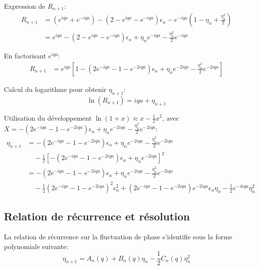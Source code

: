 Expression de $R_{n+1}$:
\begin{align*}
    R_{n+1} &= (e^{iqa} + e^{-iqa}) - (2 - e^{iqa} - e^{-iqa})\epsilon_n - e^{-iqa}\left(1 - \eta_n + \frac{\eta_n^2}{2}\right) \\
    &= e^{iqa} - (2 - e^{iqa} - e^{-iqa})\epsilon_n + \eta_n e^{-iqa} - \frac{\eta_n^2}{2} e^{-iqa}
\end{align*}

En factorisant $e^{iqa}$:
\begin{align*}
    R_{n+1} &= e^{iqa} \left[ 1 - (2e^{-iqa} - 1 - e^{-2iqa})\epsilon_n + \eta_n e^{-2iqa} - \frac{\eta_n^2}{2} e^{-2iqa} \right]
\end{align*}

Calcul du logarithme pour obtenir $\eta_{n+1}$:
\begin{equation*}
    \ln(R_{n+1}) = iqa + \eta_{n+1}
\end{equation*}

Utilisation du développement $\ln(1+x) \approx x - \frac{1}{2}x^2$, avec $X = - (2e^{-iqa} - 1 - e^{-2iqa})\epsilon_n + \eta_n e^{-2iqa} - \frac{\eta_n^2}{2} e^{-2iqa}$:
\begin{align*}
    \eta_{n+1} &= - (2e^{-iqa} - 1 - e^{-2iqa})\epsilon_n + \eta_n e^{-2iqa} - \frac{\eta_n^2}{2} e^{-2iqa} \nonumber \\
    &\quad - \frac{1}{2} {\left[ - (2e^{-iqa} - 1 - e^{-2iqa})\epsilon_n + \eta_n e^{-2iqa} \right]}^2 \\
    &= - (2e^{-iqa} - 1 - e^{-2iqa})\epsilon_n + \eta_n e^{-2iqa} - \frac{\eta_n^2}{2} e^{-2iqa} \nonumber \\
    &\quad - \frac{1}{2} {\left(2e^{-iqa} - 1 - e^{-2iqa}\right)}^2 \epsilon_n^2 + (2e^{-iqa} - 1 - e^{-2iqa})e^{-2iqa}\epsilon_n\eta_n - \frac{1}{2}e^{-4iqa}\eta_n^2
\end{align*}

\subsection{Relation de récurrence et résolution}
La relation de récurrence sur la fluctuation de phase s'identifie sous la forme polynomiale suivante:
\begin{equation*}
    \eta_{n+1} = A_n(q) + B_n(q) \eta_n - \frac{1}{2} C_n(q) \eta_n^2
\end{equation*}

